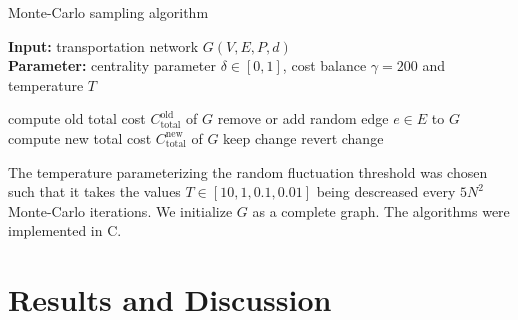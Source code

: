 \documentclass[aps,pra,showpacs,preprintnumbers,amsmath,amssymb,footinbib]{revtex4-2}
\def\CC{{C\nolinebreak[4]\hspace{-.05em}\raisebox{.4ex}{\tiny\bf ++}}}
\begin{document}
    \begin{algorithm}[H]
        \caption{Monte-Carlo sampling algorithm}
        \textbf{Input:} transportation network $G(V, E, P, d)$ \\
        \textbf{Parameter:} centrality parameter $\delta \in [0, 1]$, cost balance $\gamma = 200$ and temperature $T$
        \label{alg:mcsa}
        \begin{algorithmic}[1]
                \State compute old total cost $C_{\mathrm{total}}^{\mathrm{old}}$ of $G$
                \State remove or add random edge $e \in E$ to $G$
                \State compute new total cost $C_{\mathrm{total}}^{\mathrm{new}}$ of $G$
                    \State keep change
                \Else
                    \State revert change
                \EndIf
            \EndProcedure
            \Statex
                \State {}
            \EndFor
        \end{algorithmic}
    \end{algorithm}

    
    The temperature parameterizing the random fluctuation threshold was chosen such that it takes the values $T \in [10, 1, 0.1, 0.01]$ being descreased every $5 N^2$ Monte-Carlo iterations. 
    We initialize $G$ as a complete graph.
    The algorithms were implemented in \CC. 

    \section{Results and Discussion}
\end{document}
